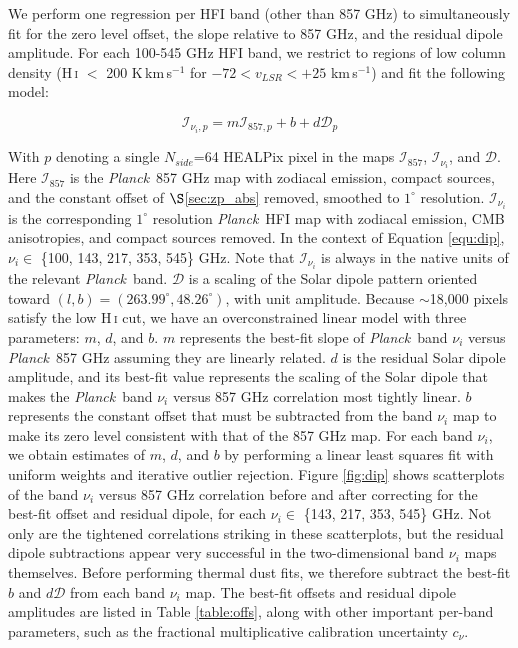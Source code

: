 \documentclass{emulateapj}
\newcommand{\PLANCK}{{\it Planck}}
\begin{document}
We perform one regression per HFI band (other than 857 GHz) to simultaneously 
fit for the zero level offset, the slope relative to 857 GHz, and the residual 
dipole amplitude. For each 100-545 GHz HFI band, we restrict to regions of low 
column density (H\,\textsc{i} $<$ 200 K\,km\,s$^{-1}$ for 
$-72$$<$$v_{LSR}$$<$$+25$ km\,s$^{-1}$) and fit the following model:

\begin{equation} \label{equ:dip}
\mathcal{I}_{\nu_i, p} = m\mathcal{I}_{857, p} + b + d\mathcal{D}_{p}
\end{equation}

With $p$ denoting a single $N_{side}$=64 HEALPix pixel \citep{healpix} in the 
maps $\mathcal{I}_{857}$, $\mathcal{I}_{\nu_i}$, and $\mathcal{D}$. Here 
$\mathcal{I}_{857}$ is the \PLANCK~857 GHz map with zodiacal emission, compact 
sources, and the constant offset of $\S$\ref{sec:zp_abs} removed, smoothed to 
$1^{\circ}$ resolution. $\mathcal{I}_{\nu_i}$ is the corresponding $1^{\circ}$ 
resolution \PLANCK~HFI map with zodiacal emission, CMB anisotropies, and
compact sources removed. In the context of Equation \ref{equ:dip}, $\nu_i \in$ 
\{100, 143, 217, 353, 545\} GHz. Note that $\mathcal{I}_{\nu_i}$ is always in
the native units of the relevant \PLANCK~band. $\mathcal{D}$ is a scaling of 
the Solar dipole pattern oriented toward 
$(l, b) = (263.99^{\circ}, 48.26^{\circ})$, with unit amplitude. Because 
$\sim$18,000 pixels satisfy the low H\,\textsc{i} cut, we have an 
overconstrained linear model with three parameters: $m$, $d$, and $b$. $m$ 
represents the best-fit slope of \PLANCK~band $\nu_i$ versus \PLANCK~857 GHz 
assuming they are linearly related. $d$ is the residual Solar dipole amplitude,
and its best-fit value represents the scaling of the Solar dipole that makes 
the \PLANCK~band $\nu_i$ versus 857 GHz correlation most tightly linear. $b$ 
represents the constant offset that must be subtracted from the band $\nu_i$ 
map to make its zero level consistent with that of the 857 GHz map. For each 
band $\nu_i$, we obtain estimates of $m$, $d$, and $b$ by performing a linear 
least squares fit with uniform weights and iterative outlier rejection. Figure 
\ref{fig:dip} shows scatterplots of the band $\nu_i$ versus 857 GHz correlation
 before and after correcting for the best-fit offset and residual dipole, for 
each $\nu_i \in$ \{143, 217, 353, 545\} GHz. Not only are the tightened 
correlations striking in these scatterplots, but the residual dipole 
subtractions appear very successful in the two-dimensional band $\nu_i$ maps 
themselves. Before performing thermal dust fits, we therefore subtract the 
best-fit $b$ and $d\mathcal{D}$ from each band $\nu_i$ map. The best-fit 
offsets and residual dipole amplitudes are listed in Table \ref{table:offs},
along with other important per-band parameters, such as the fractional 
multiplicative calibration uncertainty $c_{\nu}$.
\end{document}
